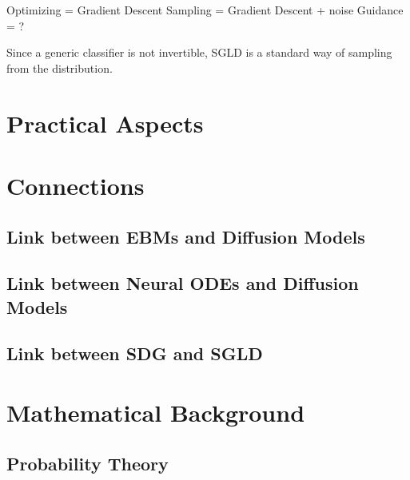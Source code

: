 \documentclass[a4paper, 11pt]{article}
\begin{document}
Optimizing = Gradient Descent
Sampling = Gradient Descent + noise
Guidance = ?

Since a generic classifier is not invertible, SGLD is a standard way of sampling from the distribution.

\section{Practical Aspects}

\section{Connections}
\subsection{Link between EBMs and Diffusion Models}
\subsection{Link between Neural ODEs and Diffusion Models}
\subsection{Link between SDG and SGLD}

\appendix
\section{Mathematical Background}
\subsection{Probability Theory}




\end{document}
